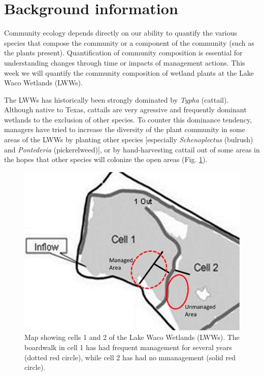 \documentclass[]{book}
\theoremstyle{definition}
\theoremstyle{definition}
\theoremstyle{definition}
\theoremstyle{remark}
\begin{document}
\section{Background information}\label{background-information-2}

Community ecology depends directly on our ability to quantify the
various species that compose the community or a component of the
community (such as the plants present). Quantification of community
composition is essential for understanding changes through time or
impacts of management actions. This week we will quantify the community
composition of wetland plants at the Lake Waco Wetlands (LWWs).

The LWWs has historically been strongly dominated by \emph{Typha}
(cattail). Although native to Texas, cattails are very agressive and
frequently dominant wetlands to the exclusion of other species. To
counter this dominance tendency, managers have tried to increase the
diversity of the plant community in some areas of the LWWs by planting
other species {[}especially \emph{Schenoplectus} (bulrush) and
\emph{Pontederia} (pickerelweed){]}, or by hand-harvesting cattail out
of some areas in the hopes that other species will colonize the open
areas (Fig. \ref{fig:restoration-fig}).

\begin{figure}
\centering
\includegraphics{chapter_materials/restoration_ecology/lww_management.jpg}
\caption{\label{fig:restoration-fig}Map showing cells 1 and 2 of the Lake
Waco Wetlands (LWWs). The boardwalk in cell 1 has had frequent
management for several years (dotted red circle), while cell 2 has had
no mmanagement (solid red circle).}
\end{figure}
\end{document}

